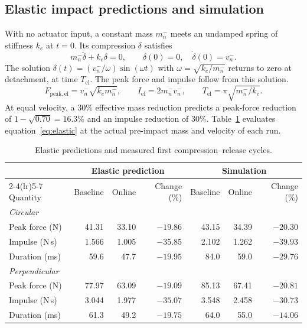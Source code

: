 \documentclass[11pt,a4paper]{article}
\newcommand{\ms}{m_n^-}
\newcommand{\vs}{v_n^-}
\begin{document}
\subsection{Elastic impact predictions and simulation}
With no actuator input, a constant mass $\ms$ meets an undamped spring of
stiffness $k_e$ at $t=0$. Its compression $\delta$ satisfies
\begin{equation}
 \ms\ddot\delta+k_e\delta=0,\qquad
 \delta(0)=0,\quad\dot\delta(0)=\vs .
\end{equation}
The solution $\delta(t)=(\vs/\omega)\sin(\omega t)$ with
$\omega=\sqrt{k_e/\ms}$ returns to zero at detachment, at time $T_{\mathrm{el}}$.
The peak force and impulse follow from this solution.
\begin{equation}
 F_{\mathrm{peak,el}}=\vs\sqrt{k_e\ms},\qquad
 I_{\mathrm{el}}=2\ms\vs,\qquad
 T_{\mathrm{el}}=\pi\sqrt{\ms/k_e}.
 \label{eq:elastic}
\end{equation}
At equal velocity, a 30\% effective mass reduction predicts a peak-force
reduction of $1-\sqrt{0.70}=16.3\%$ and an impulse reduction of 30\%.
Table~\ref{tab:elastic} evaluates equation~\eqref{eq:elastic} at the
actual pre-impact mass and velocity of each run.

\begin{table}[htbp]
\centering
\small
\setlength{\tabcolsep}{5pt}
\begin{tabular}{lrrrrrr}
\toprule
&\multicolumn{3}{c}{Elastic prediction}&\multicolumn{3}{c}{Simulation}\\
\cmidrule(lr){2-4}\cmidrule(lr){5-7}
Quantity & Baseline & Online & Change (\%) & Baseline & Online & Change (\%)\\
\midrule
\multicolumn{7}{l}{\emph{Circular}}\\
Peak force (N) & 41.31 & 33.10 & $-19.86$ & 43.15 & 34.39 & $-20.30$\\
Impulse (N\,s) & 1.566 & 1.005 & $-35.85$ & 2.102 & 1.262 & $-39.93$\\
Duration (ms) & 59.6 & 47.7 & $-19.95$ & 84.0 & 59.0 & $-29.76$\\
\midrule
\multicolumn{7}{l}{\emph{Perpendicular}}\\
Peak force (N) & 77.97 & 63.09 & $-19.09$ & 85.13 & 67.41 & $-20.81$\\
Impulse (N\,s) & 3.044 & 1.977 & $-35.07$ & 3.548 & 2.458 & $-30.73$\\
Duration (ms) & 61.3 & 49.2 & $-19.75$ & 64.0 & 55.0 & $-14.06$\\
\bottomrule
\end{tabular}
\caption{Elastic predictions and measured first compression--release cycles.}
\label{tab:elastic}
\end{table}
\end{document}
